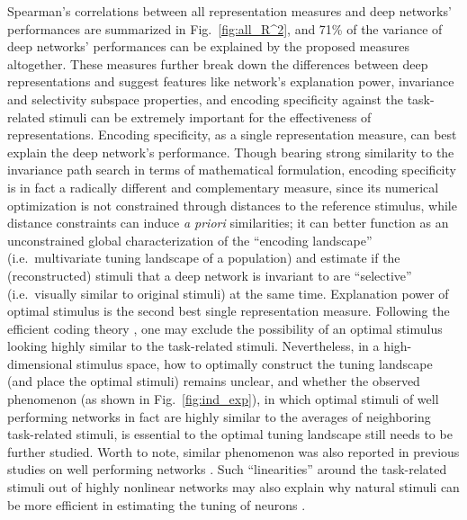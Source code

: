 
Spearman's correlations between all representation measures and deep networks' performances are summarized in Fig.~\ref{fig:all_R^2}, and 71\% of the variance of deep networks' performances can be explained by the proposed measures altogether. These measures further break down the differences between deep representations and suggest features like network's explanation power, invariance and selectivity subspace properties, and encoding specificity against the task-related stimuli can be extremely important for the effectiveness of representations. Encoding specificity, as a single representation measure, can best explain the deep network's performance. Though bearing strong similarity to the invariance path search in terms of mathematical formulation, encoding specificity is in fact a radically different and complementary measure, since its numerical optimization is not constrained through distances to the reference stimulus, while distance constraints can induce \emph{a priori} similarities; it can better function as an unconstrained global characterization of the ``encoding landscape'' (i.e.~multivariate tuning landscape of a population) and estimate if the (reconstructed) stimuli that a deep network is invariant to are ``selective'' (i.e.~visually similar to original stimuli) at the same time. Explanation power of optimal stimulus is the second best single representation measure. Following the efficient coding theory \cite{barlow1961possible, laughlin1981simple}, one may exclude the possibility of an optimal stimulus looking highly similar to the task-related stimuli. Nevertheless, in a high-dimensional stimulus space, how to optimally construct the tuning landscape (and place the optimal stimuli) remains unclear, and whether the observed phenomenon (as shown in Fig.~\ref{fig:ind_exp}), in which optimal stimuli of well performing networks in fact are highly similar to the averages of neighboring task-related stimuli, is essential to the optimal tuning landscape still needs to be further studied. Worth to note, similar phenomenon was also reported in previous studies on well performing networks \cite{le2012building, simonyan2013deep}. Such ``linearities'' around the task-related stimuli out of highly nonlinear networks may also explain why natural stimuli can be more efficient in estimating the tuning of neurons \cite{talebi2012natural}. 

